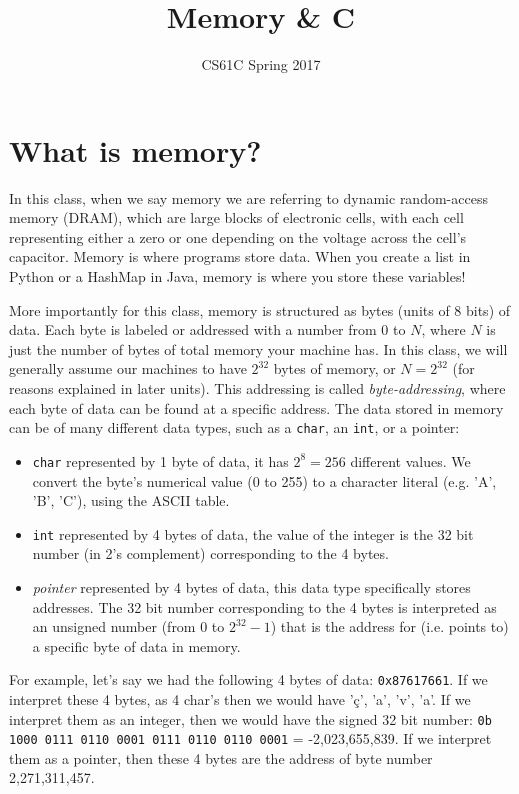 \documentclass{article}
\title{Memory \& C}
\author{CS61C Spring 2017}
\date{ }
\begin{document}
\maketitle
\tableofcontents


\section{What is memory?}

In this class, when we say memory we are referring to dynamic random-access memory (DRAM), which are large blocks of electronic cells, with each cell representing either a zero or one depending on the voltage across the cell's capacitor. Memory is where programs store data. When you create a list in Python or a HashMap in Java, memory is where you store these variables!

More importantly for this class, memory is structured as bytes (units of 8 bits) of data. Each byte is labeled or addressed with a number from 0 to $N$, where $N$ is just the number of bytes of total memory your machine has. In this class, we will generally assume our machines to have $2^{32}$ bytes of memory, or $N = 2^{32}$ (for reasons explained in later units).  This addressing is called \textit{byte-addressing}, where each byte of data can be found at a specific address. The data stored in memory can be of many different data types, such as a \texttt{char}, an \texttt{int}, or a pointer:
\begin{itemize} 
\item \texttt{char} represented by 1 byte of data, it has $2^8 = 256$ different values. We convert the byte's numerical value (0 to 255) to a character literal (e.g. 'A', 'B', 'C'), using the ASCII table.
\item \texttt{int} represented by 4 bytes of data, the value of the integer is the 32 bit number (in 2's complement) corresponding to the 4 bytes.  
\item \textit{pointer} represented by 4 bytes of data, this data type specifically stores addresses. The 32 bit number corresponding to the 4 bytes is interpreted as an unsigned number (from $0$ to $2^{32} - 1$) that is the address for (i.e. points to) a specific byte of data in memory. 
\end{itemize}

For example, let's say we had the following 4 bytes of data: \texttt{0x87617661}. If we interpret these 4 bytes, as 4 char's then we would have '\c{c}', 'a', 'v', 'a'. If we interpret them as an integer, then we would have the signed 32 bit number: \texttt{0b 1000 0111 0110 0001 0111 0110 0110 0001} = -2,023,655,839. If we interpret them as a pointer, then these 4 bytes are the address of byte number 2,271,311,457. 
\end{document}

